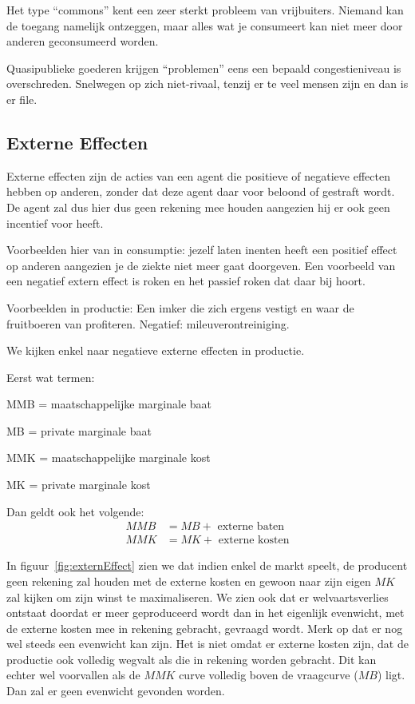 Het type ``commons'' kent een zeer sterkt probleem van vrijbuiters. Niemand kan de toegang namelijk ontzeggen, maar alles wat je consumeert kan niet meer door anderen geconsumeerd worden.

Quasipublieke goederen krijgen ``problemen'' eens een bepaald congestieniveau is overschreden. Snelwegen op zich niet-rivaal, tenzij er te veel mensen zijn en dan is er file.

\subsection{Externe Effecten}
Externe effecten zijn de acties van een agent die positieve of negatieve effecten hebben op anderen, zonder dat deze agent daar voor beloond of gestraft wordt. De agent zal dus hier dus geen rekening mee houden aangezien hij er ook geen incentief voor heeft.

Voorbeelden hier van in consumptie: jezelf laten inenten heeft een positief effect op anderen aangezien je de ziekte niet meer gaat doorgeven. Een voorbeeld van een negatief extern effect is roken en het passief roken dat daar bij hoort.

Voorbeelden in productie: Een imker die zich ergens vestigt en waar de fruitboeren van profiteren. Negatief: mileuverontreiniging.

We kijken enkel naar negatieve externe effecten in productie.

Eerst wat termen:
\begin{description}
   \item{MMB} = maatschappelijke marginale baat
   \item{MB} = private marginale baat
   \item{MMK} = maatschappelijke marginale kost
   \item{MK} = private marginale kost
\end{description}

Dan geldt ook het volgende:
\begin{align*}
   MMB &= MB + \text{ externe baten}\\
   MMK &= MK + \text{ externe kosten}
\end{align*}

In figuur~\ref{fig:externEffect} zien we dat indien enkel de markt speelt, de producent geen rekening zal houden met de externe kosten en gewoon naar zijn eigen $MK$ zal kijken om zijn winst te maximaliseren. We zien ook dat er welvaartsverlies ontstaat doordat er meer geproduceerd wordt dan in het eigenlijk evenwicht, met de externe kosten mee in rekening gebracht, gevraagd wordt. Merk op dat er nog wel steeds een evenwicht kan zijn. Het is niet omdat er externe kosten zijn, dat de productie ook volledig wegvalt als die in rekening worden gebracht. Dit kan echter wel voorvallen als de $MMK$ curve volledig boven de vraagcurve ($MB$) ligt. Dan zal er geen evenwicht gevonden worden.

